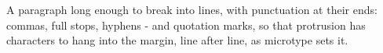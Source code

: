 \documentclass{article}
\begin{document}
A paragraph long enough to break into lines, with punctuation at their ends:
commas, full stops, hyphens - and quotation marks, so that protrusion has
characters to hang into the margin, line after line, as microtype sets it.
\end{document}
